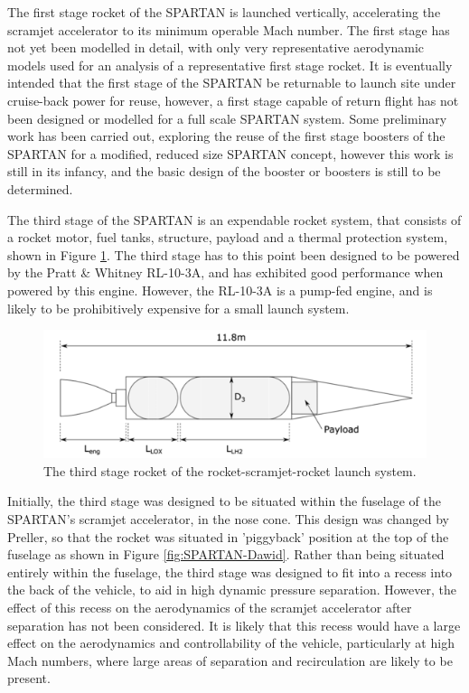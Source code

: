  

The first stage rocket of the SPARTAN is launched vertically, accelerating the scramjet accelerator to its minimum operable Mach number. The first stage has not yet been modelled in detail, with only very representative aerodynamic models used for an analysis of a representative first stage rocket.
It is eventually intended that the first stage of the SPARTAN be returnable to launch site under cruise-back power for reuse, however, a first stage capable of return flight has not been designed or modelled for a full scale SPARTAN system\cite{Preller2017b,Preller2018a}.
 Some preliminary work has been carried out, exploring the reuse of the first stage boosters of the SPARTAN \cite{chai2017} for a modified, reduced size SPARTAN concept, however this work is still in its infancy, and the basic design of the booster or boosters is still to be determined\cite{Preller2017b,Preller2018a}.
 
  

The third stage of the SPARTAN is an expendable rocket system, that consists of a rocket motor, fuel tanks, structure, payload and a thermal protection system\cite{Preller2017b}, shown in Figure \ref{fig:ThirdStage}. The third stage has to this point been designed to be powered by the Pratt \& Whitney RL-10-3A\cite{Preller2017b}, and has exhibited good performance when powered by this engine. However, the RL-10-3A is a pump-fed engine, and is likely to be prohibitively expensive for a small launch system.
\begin{figure}[ht]
	\centering
	\includegraphics[width=0.7\linewidth]{figures/2_literature-review/ThirdStage}
	\caption{The third stage rocket of the rocket-scramjet-rocket launch system\cite{Preller2017b}.}
	\label{fig:ThirdStage}
\end{figure}
 Initially, the third stage was designed to be situated within the fuselage of the SPARTAN's scramjet accelerator, in the nose cone\cite{Jazra2013}. This design was changed by Preller\cite{Preller2018a,Preller2017b}, so that the rocket was situated in 'piggyback' position at the top of the fuselage as shown in Figure \ref{fig:SPARTAN-Dawid}. Rather than being situated entirely within the fuselage, the third stage was designed to fit into a recess into the back of the vehicle, to aid in high dynamic pressure separation. However, the effect of this recess on the aerodynamics of the scramjet accelerator after separation has not been considered\cite{Preller2018a,Preller2017b}. It is likely that this recess would have a large effect on the aerodynamics and controllability of the vehicle, particularly at high Mach numbers, where large areas of separation and recirculation are likely to be present. 





